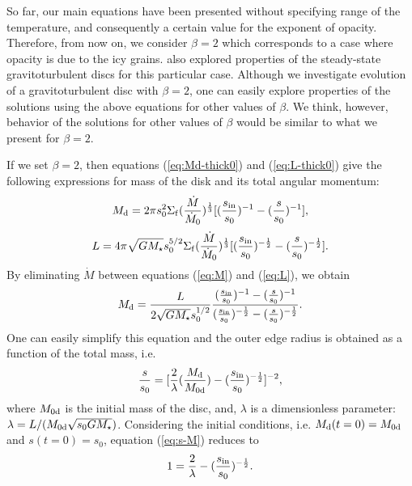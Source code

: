 \documentclass[apj]{emulateapj}
\begin{document}
So far, our main equations have been presented without specifying range of the temperature, and consequently   a certain value for the exponent of opacity. Therefore,  from now on, we consider $\beta =2$ which corresponds to a case where opacity is due to the icy grains. \cite{rafikov2009} also explored properties of the steady-state gravitoturbulent discs for this particular case. Although we  investigate  evolution of a gravitoturbulent disc with $\beta =2$, one can easily explore properties of the solutions using the above equations for other values of $\beta$. We think, however, behavior of the solutions for other values of $\beta$ would be similar to what we present for $\beta =2$. 
%

If we set $\beta =2$, then equations (\ref{eq:Md-thick0}) and (\ref{eq:L-thick0}) give the following expressions for  mass of the disk and its total angular momentum:
%
\begin{equation}\label{eq:M}
M_{\rm d}=2\pi s_{0}^2 \Sigma_{\rm f} (\frac{\dot{M}}{\dot{M}_0 })^{\frac{1}{3}} [(\frac{s_{\rm in}}{s_0 })^{-1} - (\frac{s}{s_0})^{-1}],
\end{equation}
%
\begin{equation}\label{eq:L}
L=4\pi \sqrt{GM_{\star}} s_{0}^{5/2} \Sigma_{\rm f} (\frac{\dot{M}}{\dot{M}_0 })^{\frac{1}{3}} [(\frac{s_{\rm in}}{s_0 })^{-\frac{1}{2}} - (\frac{s}{s_0})^{-\frac{1}{2}}].
\end{equation}
%
By eliminating $\dot{M}$ between equations (\ref{eq:M}) and (\ref{eq:L}), we obtain
\begin{equation}
M_{\rm d}=\frac{L}{2\sqrt{GM_{\star}} s_{0}^{1/2}}\frac{(\frac{s_{\rm in}}{s_0 })^{-1} - (\frac{s}{s_0})^{-1}}{(\frac{s_{\rm in}}{s_0 })^{-\frac{1}{2}} - (\frac{s}{s_0})^{-\frac{1}{2}}}.
\end{equation}
%
%
One can easily simplify this equation and the outer edge radius is obtained as a function of the total mass, i.e.
%
\begin{equation}\label{eq:s-M}
\frac{s}{s_0}=[\frac{2}{\lambda}(\frac{M_{\rm d}}{M_{\rm 0d}})-(\frac{s_{\rm in}}{s_0})^{-\frac{1}{2}}]^{-2},
\end{equation}
%
where $M_{\rm 0d}$ is the initial mass of the disc, and, $\lambda$ is a dimensionless parameter: $\lambda = L/(M_{\rm 0d} \sqrt{s_{0}GM_{\star}})$. Considering the initial conditions, i.e. $M_{\rm d}(t=0)=M_{\rm 0d}$ and $s(t=0)=s_0$, equation (\ref{eq:s-M}) reduces to 
%
\begin{equation}\label{eq:lambda}
1=\frac{2}{\lambda} - (\frac{s_{\rm in}}{s_0})^{-\frac{1}{2}}.
\end{equation}
\end{document}
